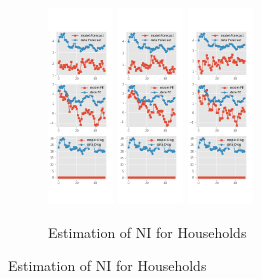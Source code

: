 \documentclass[]{article}
\begin{document}
\begin{figure}[ht]
	\centering
	\begin{subfigure}[b]{\textwidth}
		\centering
		\caption{Estimation of NI  for Households}
		\label{NI_diag_SCE}
		\includegraphics[width=0.19\textwidth]{figures/sce_ni_est_diag0.png}
		\includegraphics[width=0.19\textwidth]{figures/sce_ni_est_diag1.png}
		\includegraphics[width=0.19\textwidth]{figures/sce_ni_est_diag2.png}

\end{subfigure}
\end{figure}
\end{document}
